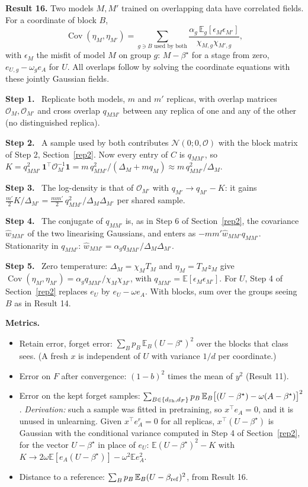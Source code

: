 \documentclass[10pt]{article}
\newcommand{\bs}{\beta^\star}\newcommand{\E}{\mathbb E}\newcommand{\asinh}{\operatorname{arcsinh}}\newcommand{\sk}{\sqrt k}
\newcommand{\step}[1]{\par\smallskip\textbf{Step #1.}\ }
\begin{document}
\textbf{Result 16.} Two models $M,M'$ trained on overlapping data have correlated fields. For a coordinate of block $B$,
\[
\operatorname{Cov}(\eta_M,\eta_{M'})=\sum_{g\ni B\text{ used by both}}\frac{\alpha_g\,\E_g[\epsilon_M\epsilon_{M'}]}{\chi_{M,g}\chi_{M',g}},
\]
with $\epsilon_M$ the misfit of model $M$ on group $g$: $M-\bs$ for a stage from zero, $e_{U,g}-\omega_ge_A$ for $U$. All overlaps follow by solving the coordinate equations with these jointly Gaussian fields.
\step1 Replicate both models, $m$ and $m'$ replicas, with overlap matrices $\mathcal O_M,\mathcal O_{M'}$ and cross overlap $q_{MM'}$ between any replica of one and any of the other (no distinguished replica).
\step2 A sample used by both contributes $\mathcal N(0;0,\mathcal O)$ with the block matrix of Step 2, Section~\ref{rep2}. Now every entry of $C$ is $q_{MM'}$, so $K=q_{MM'}^2\,\mathbf 1^\top\mathcal O_M^{-1}\mathbf 1=m\,q_{MM'}^2/(\Delta_M+mq_M)\approx m\,q_{MM'}^2/\Delta_M$.
\step3 The log-density is that of $\mathcal O_{M'}$ with $q_{M'}\to q_{M'}-K$: it gains $\frac{m'}2K/\Delta_{M'}=\frac{mm'}2\,q_{MM'}^2/\Delta_M\Delta_{M'}$ per shared sample.
\step4 The conjugate of $q_{MM'}$ is, as in Step 6 of Section~\ref{rep2}, the covariance $\hat w_{MM'}$ of the two linearising Gaussians, and enters as $-mm'\hat w_{MM'}q_{MM'}$. Stationarity in $q_{MM'}$: $\hat w_{MM'}=\alpha_gq_{MM'}/\Delta_M\Delta_{M'}$.
\step5 Zero temperature: $\Delta_M=\chi_MT_M$ and $\eta_M=T_Mz_M$ give $\operatorname{Cov}(\eta_M,\eta_{M'})=\alpha_gq_{MM'}/\chi_M\chi_{M'}$, with $q_{MM'}=\E[\epsilon_M\epsilon_{M'}]$. For $U$, Step 4 of Section~\ref{rep2} replaces $e_U$ by $e_U-\omega e_A$. With blocks, sum over the groups seeing $B$ as in Result 14.

\textbf{Metrics.}
\begin{itemize}[nosep,leftmargin=1.2em]
\item Retain error, forget error: $\sum_Bp_B\,\E_B(U-\bs)^2$ over the blocks that class sees. (A fresh $x$ is independent of $U$ with variance $1/d$ per coordinate.)
\item Error on $F$ after convergence: $(1-b)^2$ times the mean of $y^2$ (Result 11).
\item Error on the kept forget samples: $\sum_{B\in\{\dSh,d_F\}}p_B\,\E_B\big[(U-\bs)-\omega(A-\bs)\big]^2$. \emph{Derivation:} such a sample was fitted in pretraining, so $x^\top e_A=0$, and it is unused in unlearning. Given $x^\top e_A^r=0$ for all replicas, $x^\top(U-\bs)$ is Gaussian with the conditional variance computed in Step 4 of Section~\ref{rep2}, for the vector $U-\bs$ in place of $e_U$: $\E(U-\bs)^2-K$ with $K\to2\omega\E[e_A(U-\bs)]-\omega^2\E e_A^2$.
\item Distance to a reference: $\sum_Bp_B\,\E_B(U-\beta_{\rm ref})^2$, from Result 16.
\end{itemize}
\end{document}
